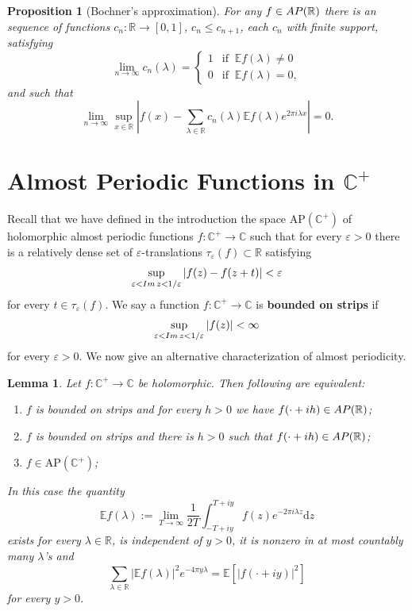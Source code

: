 \documentclass[a4paper,reqno,12pt]{amsart}
\newtheorem{lemma}[theorem]{Lemma}
\newtheorem{proposition}[theorem]{Proposition}\newtheorem{corollary}[theorem]{Corollary}
\newcommand{\E}{\mathcal{E}}
\renewcommand{\H}{\mathbb{C}^+}
\renewcommand{\r}{\mathbb{R}}
\newcommand{\cp}{\mathbb{C}} %
\newcommand{\la}{\lambda}
\newcommand{\ep}{\varepsilon}
\renewcommand{\d}{\mathrm{d}}
\newcommand{\1}{{\bf 1}}
\newcommand{\apc}{\mathrm{AP}(\H)}
\renewcommand{\E}{\mathbb{E}}
\renewcommand{\emph}[1]{{\bf #1}}
\newcommand{\apr}{{\rm AP}(\r)}
\renewcommand{\1}{{\bo 1}}
\renewcommand{\Im}{{\rm Im}\,}
\begin{document}
\begin{proposition}[Bochner's approximation]\label{prop:bochapprox}
For any $f\in \apr$ there is an sequence of functions $c_n: \r \to [0,1]$, $c_n\leq c_{n+1}$, each $c_n$ with finite support, satisfying 
$$
\lim_{n\to\infty} c_{n}(\la) = \begin{cases} 1 &\mbox{if }\ \E f(\la)\neq 0 \\ 
 0 &\mbox{if }\  \E f(\la)= 0,
\end{cases}
$$
and such that 
$$
\lim_{n\to\infty} \sup_{x\in \r} |f(x) - \sum_{\la\in\r} c_n(\la)\E f(\la) e^{2\pi i \la x}|=0.
$$
\end{proposition}

\section{Almost Periodic Functions in $\H$}\label{sec:apc} Recall that we have defined in the introduction the space $\apc$ of holomorphic almost periodic functions $f:\H\to\cp$ such that for every $\ep>0$ there is a relatively dense set of $\ep$-translations $\tau_\ep(f) \subset \r$ satisfying
$$
\sup_{\ep < \Im z < 1/\ep} |f(z)-f(z+t)|<\ep
$$ 
for every $t\in \tau_\ep(f)$. We say a function $f:\H \to \cp$ is \emph{bounded on strips} if $$\sup_{\ep < \Im z < 1/\ep} |f(z)|<\infty$$ for every $\ep>0$. We now give an alternative characterization of almost periodicity.

\begin{lemma}\label{lem:altdefapc}
Let $f : \H \to \cp$ be holomorphic. Then following are equivalent:
\begin{enumerate}
\item $f$ is bounded on strips and for every $h>0$ we have $f(\cdot +ih)\in \apr$;
\item $f$ is bounded on strips and there is $h>0$ such that $f(\cdot + ih) \in \apr$;
\item $f\in \apc$;
\end{enumerate}
In this case the quantity
$$
\E f(\la) := \lim_{T\to\infty} \frac{1}{2T}\int_{-T+iy}^{T+iy} f(z)e^{-2\pi i \la z}\d z
$$
exists for every $\la\in\r$, is independent of $y>0$, it is nonzero in at most countably many $\la$'s and
$$
\sum_{\la\in\r}|\E f(\la)|^2e^{-4\pi y \la} = \E [|f(\cdot +iy)|^2]
$$
for every $y>0$.
\end{lemma}
\end{document}
